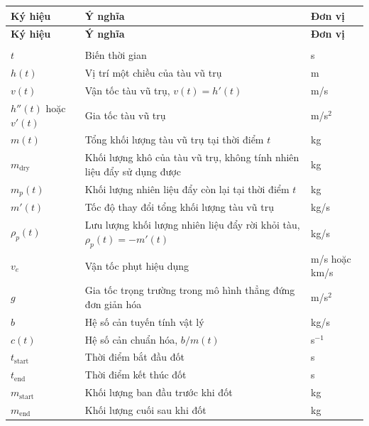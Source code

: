 ﻿\documentclass[12pt]{article}
\begin{document}
\label{tab:spacecraft-notation}
\edef\spacecraftnotationtable{\thetable}
\begin{longtable}{|>{\centering\arraybackslash}p{2.4cm}
                  |>{\raggedright\arraybackslash}p{8.8cm}
                  |>{\centering\arraybackslash}p{2.4cm}|}
\hline
\textbf{Ký hiệu} & \textbf{Ý nghĩa} & \textbf{Đơn vị} \\
\hline
\endfirsthead

\hline
\textbf{Ký hiệu} & \textbf{Ý nghĩa} & \textbf{Đơn vị} \\
\hline
\endhead

\hline
\multicolumn{3}{r}{\textit{Xem tiếp ở trang sau}}\\
\hline
\endfoot

\hline
\endlastfoot

$t$ & Biến thời gian & s \\
\hline
$h(t)$ & Vị trí một chiều của tàu vũ trụ & m \\
\hline
$v(t)$ & Vận tốc tàu vũ trụ, $v(t) = h'(t)$ & m/s \\
\hline
$h''(t)$ hoặc $v'(t)$ & Gia tốc tàu vũ trụ & m/s$^2$ \\
\hline
$m(t)$ & Tổng khối lượng tàu vũ trụ tại thời điểm $t$ & kg \\
\hline
$m_{\mathrm{dry}}$ & Khối lượng khô của tàu vũ trụ, không tính nhiên liệu đẩy sử dụng được & kg \\
\hline
$m_p(t)$ & Khối lượng nhiên liệu đẩy còn lại tại thời điểm $t$ & kg \\
\hline
$m'(t)$ & Tốc độ thay đổi tổng khối lượng tàu vũ trụ & kg/s \\
\hline
$\rho_p(t)$ & Lưu lượng khối lượng nhiên liệu đẩy rời khỏi tàu, $\rho_p(t) = -m'(t)$ & kg/s \\
\hline
$v_e$ & Vận tốc phụt hiệu dụng & m/s hoặc km/s \\
\hline
$g$ & Gia tốc trọng trường trong mô hình thẳng đứng đơn giản hóa & m/s$^2$ \\
\hline
$b$ & Hệ số cản tuyến tính vật lý & kg/s \\
\hline
$c(t)$ & Hệ số cản chuẩn hóa, $b/m(t)$ & s$^{-1}$ \\
\hline
$t_{\mathrm{start}}$ & Thời điểm bắt đầu đốt & s \\
\hline
$t_{\mathrm{end}}$ & Thời điểm kết thúc đốt & s \\
\hline
$m_{\mathrm{start}}$ & Khối lượng ban đầu trước khi đốt & kg \\
\hline
$m_{\mathrm{end}}$ & Khối lượng cuối sau khi đốt & kg \\

\end{longtable}
\end{document}
